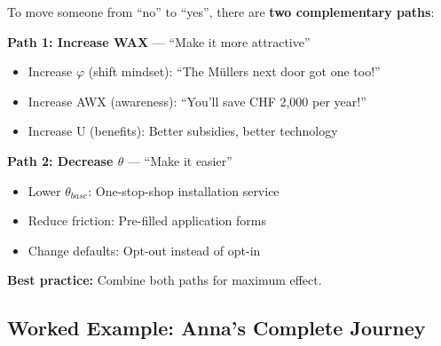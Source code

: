 To move someone from ``no'' to ``yes'', there are \textbf{two complementary paths}:

\begin{center}
\end{center}

\begin{intuition}
\textbf{Path 1: Increase WAX} --- ``Make it more attractive''
\begin{itemize}
\item Increase $\varphi$ (shift mindset): ``The Müllers next door got one too!''
\item Increase AWX (awareness): ``You'll save CHF 2,000 per year!''
\item Increase U (benefits): Better subsidies, better technology
\end{itemize}

\textbf{Path 2: Decrease $\theta$} --- ``Make it easier''
\begin{itemize}
\item Lower $\theta_{base}$: One-stop-shop installation service
\item Reduce friction: Pre-filled application forms
\item Change defaults: Opt-out instead of opt-in
\end{itemize}

\textbf{Best practice:} Combine both paths for maximum effect.
\end{intuition}

\subsection{Worked Example: Anna's Complete Journey}

